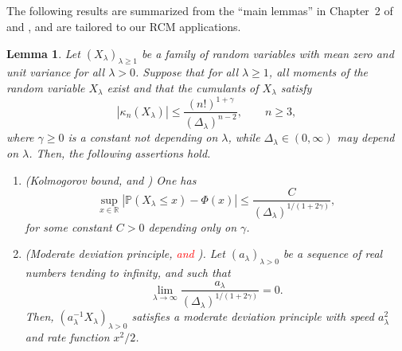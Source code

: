 \documentclass[bj,authoryear,noshowframe]{imsart}
\theoremstyle{plain}
\newtheorem{lemma}[theorem]{Lemma}
\theoremstyle{remark}
\newcommand{\IP}{\mathbb{P}}
\newcommand{\R}{\mathbb{R}}
\begin{document}
\begin{appendix}
\section*{}\label{appn} %
\noindent 
The following results are summarized from the ``main lemmas'' in Chapter~2 of \cite{saulis} and \cite{doring}, and are tailored to our RCM applications.
\begin{lemma}
  \label{l1}
  Let $(X_\lambda)_{\lambda \geq 1}$ be a family of random variables with mean zero and unit variance for all $\lambda>0$. Suppose that for all $\lambda \geq 1$, all moments of the random variable $X_\lambda$ exist and that %
  the cumulants of $X_\lambda$ satisfy  
  \begin{equation}
    \label{Statuleviciuscond2}
    |\kappa_n (X_\lambda)|\le\frac{(n!)^{1+\gamma}}{(\Delta_\lambda)^{n-2}},
    \qquad
 n\ge3, 
\end{equation}
  where $\gamma\ge0$ is a constant not depending on $\lambda$, while $\Delta_\lambda\in(0,\infty)$ may depend on $\lambda$.
   Then, the following assertions hold.
\begin{enumerate}%
\item (Kolmogorov bound,
 \cite[Corollary~2.1]{saulis} and \cite[Theorem~2.4]{doering})
  One has
\begin{equation}
\sup_{x\in\R}|\IP(X_\lambda\leq x)-\Phi(x)|\leq \frac{C}{(\Delta_\lambda)^{1/(1+2\gamma)}},
\end{equation}
for some constant $C>0$ depending only on $\gamma$.
\item (Moderate deviation principle,
  \cite[Theorem~1.1]{doring} \textcolor{red}{and \cite[Theorem~3.1]{doering}}).
  Let $( a_\lambda )_{\lambda > 0}$ be a sequence of real numbers tending to infinity, and such that 
  $$
  \lim_{\lambda \to \infty}
  \frac{a_\lambda}{(\Delta_\lambda)^{1/(1+2\gamma)}}
  = 0.
  $$
  Then, $ (a_\lambda^{-1}X_\lambda)_{\lambda >0}$ satisfies a moderate deviation principle with speed $a_\lambda^2$ and rate function $x^2/2$. 

\end{enumerate}
\end{lemma}
\end{appendix}
\end{document}
